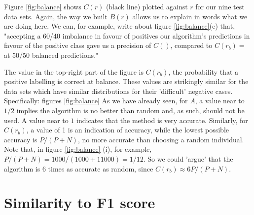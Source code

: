 \documentclass[preprint,12pt]{elsarticle}
\begin{document}
Figure \ref{fig:balance} shows $C(r)$ (black line) plotted against $r$ for our nine test data sets. Again, the way we built $B(r)$ allows us to explain in words what we are doing here. We can, for example, write about figure \ref{fig:balance}(e) that, "accepting a 60/40 imbalance in favour of positives our algorithm's predictions in favour of the positive class gave us a precision of $C()$, compared to $C(r_b)=$ at 50/50 balanced predictions." 

 The value in the top-right part of the figure is $C(r_b)$, the probability that a positive labelling is correct at balance. These values are strikingly similar for the data sets which have similar distributions for their 'difficult' negative cases. Specifically: figures \ref{fig:balance} 
As we have already seen, for $A$, a value near to $1/2$ implies the algorithm is no better than random and, as such, should not be used. A value near to $1$ indicates that the method is very accurate. Similarly, for $C(r_b)$, a value of 1 is an indication of accuracy, while the lowest possible accuracy is $P/(P+N)$, no more accurate than choosing a random individual. Note that, in figure \ref{fig:balance} (i), for example,  $P/(P+N)=1000/(1000+11000)=1/12$. So we could 'argue' that the algorithm is 6 times as accurate as random, since $C(r_b) \approx 6 P/(P+N)$. 



\section{Similarity to F1 score}
\end{document}
